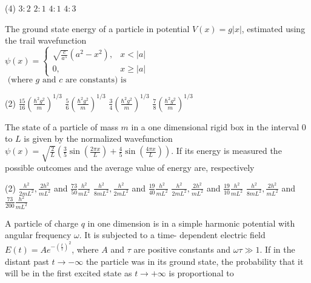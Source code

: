 \begin{enumerate}
\begin{minipage}{\textwidth}
\end{minipage}
\begin{tasks}(4)
	\task[\textbf{A.}] $3: 2$
	\task[\textbf{B.}]$2: 1$
	\task[\textbf{C.}]$4: 1$
	\task[\textbf{D.}]$4: 3$
\end{tasks}
\begin{minipage}{\textwidth}
	\item The ground state energy of a particle in potential $V(x)=g|x|$, estimated using the trail wavefunction\\
	$\psi(x)= \begin{cases}\sqrt{\frac{c}{a^{5}}}\left(a^{2}-x^{2}\right), & x<|a| \\ 0, & x \geq|a|\end{cases}$\\
	$\text { (where } g \text { and } c \text { are constants) is }$
\end{minipage}
\begin{tasks}(2)
	\task[\textbf{A.}] $\frac{15}{16}\left(\frac{\hbar^{2} g^{2}}{m}\right)^{1 / 3}$
	\task[\textbf{B.}]$\frac{5}{6}\left(\frac{\hbar^{2} g^{2}}{m}\right)^{1 / 3}$
	\task[\textbf{C.}] $\frac{3}{4}\left(\frac{\hbar^{2} g^{2}}{m}\right)^{1 / 3}$
	\task[\textbf{D.}] $\frac{7}{8}\left(\frac{\hbar^{2} g^{2}}{m}\right)^{1 / 3}$
\end{tasks}
\begin{minipage}{\textwidth}
	\item The state of a particle of mass $m$ in a one dimensional rigid box in the interval 0 to $L$ is given by the normalized wavefunction $\psi(x)=\sqrt{\frac{2}{L}}\left(\frac{3}{5} \sin \left(\frac{2 \pi x}{L}\right)+\frac{4}{5} \sin \left(\frac{4 \pi x}{L}\right)\right)$. If its energy is measured the possible outcomes and the average value of energy are, respectively
\end{minipage}
\begin{tasks}(2)
	\task[\textbf{A.}] $\frac{h^{2}}{2 m L^{2}}, \frac{2 h^{2}}{m L^{2}}$ and $\frac{73}{50} \frac{h^{2}}{m L^{2}}$
	\task[\textbf{B.}] $\frac{h^{2}}{8 m L^{2}}, \frac{h^{2}}{2 m L^{2}}$ and $\frac{19}{40} \frac{h^{2}}{m L^{2}}$
	\task[\textbf{C.}]$\frac{h^{2}}{2 m L^{2}}, \frac{2 h^{2}}{m L^{2}}$ and $\frac{19}{10} \frac{h^{2}}{m L^{2}}$
	\task[\textbf{D.}]$\frac{h^{2}}{8 m L^{2}}, \frac{2 h^{2}}{m L^{2}}$ and $\frac{73}{200} \frac{h^{2}}{m L^{2}}$
\end{tasks}
\begin{minipage}{\textwidth}
	\item A particle of charge $q$ in one dimension is in a simple harmonic potential with angular frequency $\omega .$ It is subjected to a time- dependent electric field $E(t)=A e^{-\left(\frac{t}{\tau}\right)^{2}}$, where $A$ and $\tau$ are positive constants and $\omega \tau \gg 1$. If in the distant past $t \rightarrow-\infty$ the particle was in its ground state, the probability that it will be in the first excited state as $t \rightarrow+\infty$ is proportional to

\end{minipage}
\end{enumerate}
